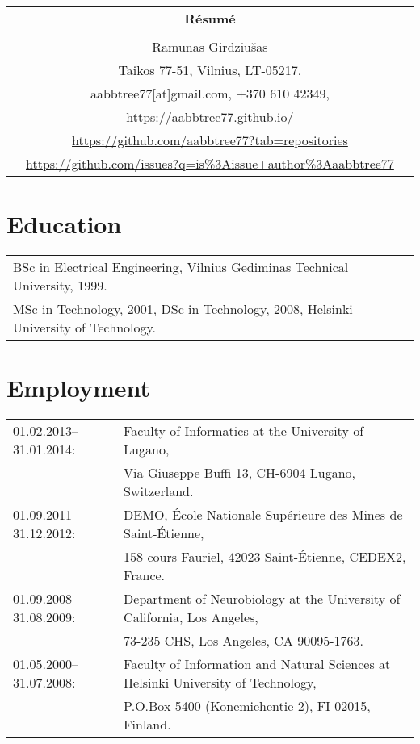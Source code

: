 \documentclass[a4paper,11pt]{article}
\begin{document}
\thispagestyle{empty}

%
%
\begin{center}
\begin{tabular}{ccc}
&\Large \textbf{R\'{e}sum\'{e}}&\\
\\
& Ram\={u}nas Girdziu\v{s}as &\\  
& Taikos 77-51, Vilnius, LT-05217. &\\
& aabbtree77[at]gmail.com, +370 610 42349, &\\
& \url{https://aabbtree77.github.io/}\\
& \url{https://github.com/aabbtree77?tab=repositories}\\
& \url{https://github.com/issues?q=is%3Aissue+author%3Aaabbtree77}
\end{tabular}
\end{center}
%
\section*{Education}
%
\begin{tabular}{ll}
        BSc in Electrical Engineering, Vilnius Gediminas Technical University, 1999.\\
        MSc in Technology, 2001, DSc in Technology, 2008, Helsinki University of Technology.
\end{tabular}
%
\section*{Employment}
%
\begin{tabular}{ll}
01.02.2013--31.01.2014: & Faculty of Informatics at the University of Lugano,\\
                        & Via Giuseppe Buffi 13, CH-6904 Lugano, Switzerland. 
\\
01.09.2011--31.12.2012: & DEMO, \'{E}cole Nationale Sup\'{e}rieure des Mines de Saint-\'{E}tienne,\\
&158 cours Fauriel, 42023 Saint-\'Etienne, CEDEX2, France.
\\
01.09.2008--31.08.2009: & Department of Neurobiology at the University of California, Los Angeles,\\
&73-235 CHS, Los Angeles, CA 90095-1763.
\\
01.05.2000--31.07.2008: & Faculty of Information and Natural Sciences at Helsinki University of Technology,\\ 
&  P.O.Box 5400 (Konemiehentie 2), FI-02015, Finland.
\end{tabular}
\end{document}
